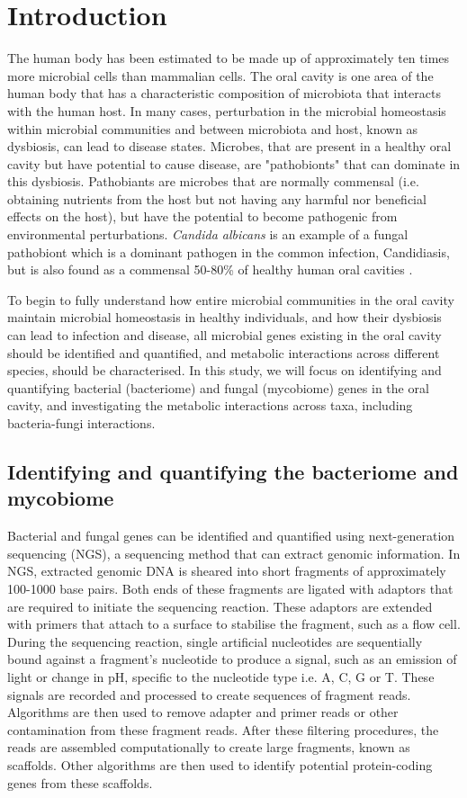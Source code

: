 \documentclass[a4paper]{article}
\begin{document}
\section{Introduction}
The human body has been estimated to be made up of approximately ten times more microbial cells than mammalian cells. The oral cavity is one area of the human body that has a characteristic composition of microbiota that interacts with the human host. In many cases, perturbation in the microbial homeostasis within microbial communities and between microbiota and host, known as dysbiosis, can lead to disease states. Microbes, that are present in a healthy oral cavity but have potential to cause disease, are "pathobionts" that can dominate in this dysbiosis. Pathobiants are microbes that are normally commensal (i.e. obtaining nutrients from the host but not having any harmful nor beneficial effects on the host), but have the potential to become pathogenic from environmental perturbations. \textit{Candida albicans} is an example of a fungal pathobiont which is a dominant pathogen in the common infection, Candidiasis, but is also found as a commensal 50-80\% of healthy human oral cavities \cite{ghannoum_characterization_2010, williams_pathogenesis_2011}.

To begin to fully understand how entire microbial communities in the oral cavity maintain microbial homeostasis in healthy individuals, and how their dysbiosis can lead to infection and disease, all microbial genes existing in the oral cavity should be identified and quantified, and metabolic interactions across different species, should be characterised. In this study, we will focus on identifying and quantifying bacterial (bacteriome) and fungal (mycobiome) genes in the oral cavity, and investigating the metabolic interactions across taxa, including bacteria-fungi interactions.

\subsection{Identifying and quantifying the bacteriome and mycobiome}
Bacterial and fungal genes can be identified and quantified using next-generation sequencing (NGS), a sequencing method that can extract genomic information. In NGS, extracted genomic DNA is sheared into short fragments of approximately 100-1000 base pairs. Both ends of these fragments are ligated with adaptors that are required to initiate the sequencing reaction. These adaptors are extended with primers that attach to a surface to stabilise the fragment, such as a flow cell. During the sequencing reaction, single artificial nucleotides are sequentially bound against a fragment's nucleotide to produce a signal, such as an emission of light or change in pH, specific to the nucleotide type i.e. A, C, G or T. These signals are recorded and processed to create sequences of fragment reads. Algorithms are then used to remove adapter and primer reads or other contamination from these fragment reads. After these filtering procedures, the reads are assembled computationally to create large fragments, known as scaffolds. Other algorithms are then used to identify potential protein-coding genes from these scaffolds.
\end{document}
